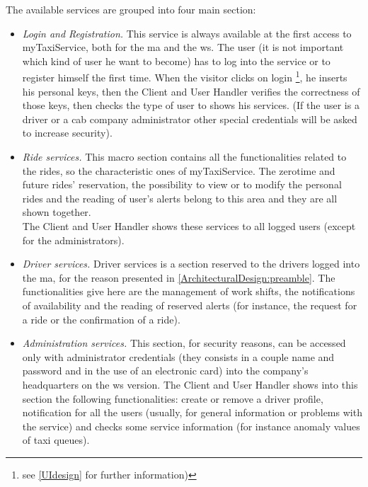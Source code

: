 \documentclass[\mainpath/main]{subfiles}
\begin{document}
The available services are grouped into four main section:\\
\begin{itemize}
	\item \textit{Login and Registration.} This service is always available at the first access to myTaxiService, both for the \gls{ma} and the \gls{ws}. The user (it is not important which kind of user he want to become) has to log into the service or to register himself the first time. When the visitor clicks on login \footnote{see \autoref{UIdesign} for further information)}, he inserts his personal keys, then the Client and User Handler verifies the correctness of those keys, then checks the type of user to shows his services. (If the user is a driver or a cab company administrator other special credentials will be asked to increase security).\\
	
	\item \textit{Ride services.} This macro section contains all the functionalities related to the rides, so the characteristic ones of myTaxiService. The zerotime and future rides' reservation, the possibility to view or to modify the personal rides and the reading of user's alerts belong to this area and they are all shown together.\\
	The Client and User Handler shows these services to all logged users (except for the administrators).\\
	
	\item \textit{Driver services.} Driver services is a section reserved to the drivers logged into the \gls{ma}, for the reason presented in \autoref{ArchitecturalDesign:preamble}. The functionalities give here are the management of work shifts, the notifications of availability and the reading of reserved alerts (for instance, the request for a ride or the confirmation of a ride).\\
	
	\item \textit{Administration services.} This section, for security reasons, can be accessed only with administrator credentials (they consists in a couple name and password and in the use of an electronic card) into the company's headquarters on the \gls{ws} version. The Client and User Handler shows into this section the following functionalities: create or remove a driver profile, notification for all the users (usually, for general information or problems with the service) and checks some service information (for instance anomaly values of taxi queues).
\end{itemize}
\end{document}
